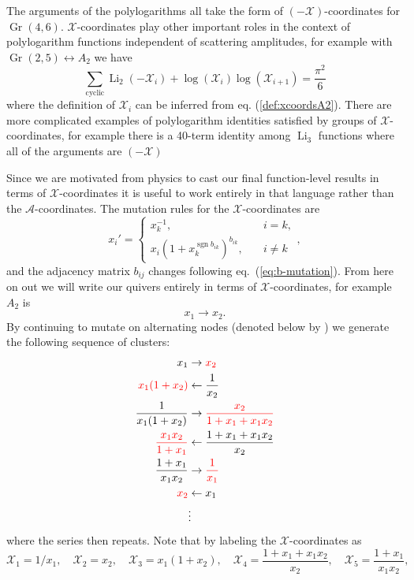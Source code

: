 \documentclass[11pt]{article}
\DeclareMathOperator{\Gr}{Gr}
\DeclareMathOperator{\Li}{Li}
\DeclareMathOperator{\sgn}{sgn}
\def\nl{\nonumber\\}
\def\nn{\nonumber}
\def\x{\mathcal{X}}
\def\a{\mathcal{A}}
\begin{document}
The arguments of the polylogarithms all take the form of $(-\x)$-coordinates for $\Gr(4,6)$. $\x$-coordinates play other important roles in the context of polylogarithm functions independent of scattering amplitudes, for example with $\Gr(2,5) \leftrightarrow A_2$ we have 
\begin{equation}
	\sum_\text{cyclic} \Li_2(-\x_i) + \log(\x_i)\log(\x_{i+1}) = \frac{\pi^2}{6}
\end{equation}
where the definition of $\x_i$ can be inferred from eq. (\ref{def:xcoordsA2}). There are more complicated examples of polylogarithm identities satisfied by groups of $\x$-coordinates, for example there is a 40-term identity among $\Li_3$ functions where all of the arguments are $(-\x)$

Since we are motivated from physics to cast our final function-level results in terms of $\x$-coordinates it is useful to work entirely in that language rather than the $\a$-coordinates. The mutation rules for the $\x$-coordinates are
\begin{equation}
  \label{eq:x-coords-mutation}
  x_{i}' =
  \begin{cases}
    x_{k}^{-1}, &\quad i=k,\\
    x_{i} (1+x_{k}^{\sgn b_{i k}})^{b_{i k}}, &\quad i \neq k
  \end{cases},
\end{equation}
and the adjacency matrix $b_{ij}$ changes following eq.~(\ref{eq:b-mutation}). From here on out we will write our quivers entirely in terms of $\x$-coordinates, for example $A_2$ is 
\begin{equation}
	x_1 \to x_2.
\end{equation}
By continuing to mutate on alternating nodes (denoted below by \mbox{\color{red}{red}}) we generate the following sequence of clusters:
\begin{align}
  x_1 &\to \color{red}{x_2} \nl
  \color{red}{x_1(1+x_2)} &\leftarrow \frac{1}{x_2} \nl
  \frac{1}{x_1(1+x_2)} &\to \color{red}{\frac{x_2}{1+x_1+x_1 x_2}} \\
  \color{red}{\frac{x_1 x_2}{1+x_1}} &\leftarrow \frac{1+x_1+x_1 x_2}{x_2} \nl
  \frac{1+x_1}{x_1 x_2} &\to \color{red}{\frac{1}{x_1}} \nl
  \color{red}{x_2} &\leftarrow x_1 \nl
  &\vdots \nn
\end{align}
where the series then repeats. Note that by labeling the $\x$-coordinates as
\begin{equation}\label{def:a2-xcoords}
  \x_1 = 1/x_1, \quad \x_2 = x_2, \quad \x_3 = x_1(1+x_2), \quad 
  \x_4 = \frac{1+x_1+x_1 x_2}{x_2}, \quad \x_5 = \frac{1+x_1}{x_1 x_2},
\end{equation}
\end{document}
